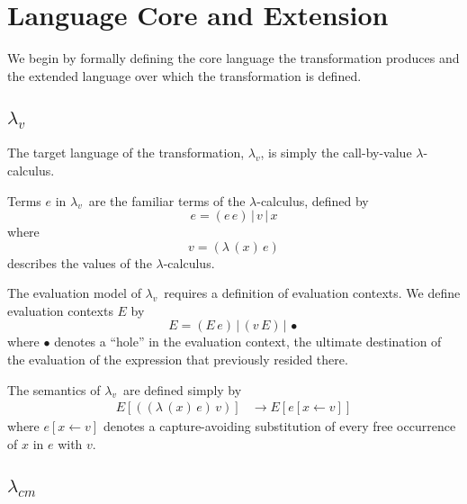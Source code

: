 \documentclass{llncs}
\newcommand{\cm}[0]{$\lambda_{cm}$}
\newcommand{\lv}[0]{$\lambda_v$}
\newcommand{\lc}[0]{$\lambda$-calculus}
\newcommand{\app}[2]{(#1\,#2)}
\newcommand{\abs}[2]{(\lambda\,(#1)\,#2)}
\newcommand{\hole}[0]{\bullet}
\newcommand{\rr}[0]{\rightarrow}
\begin{document}


\section{Language Core and Extension}

We begin by formally defining the core language the transformation produces and the extended language over which the transformation is defined.

\subsection{\lv}

The target language of the transformation, \lv, is simply the call-by-value \lc.

Terms $e$ in \lv\ are the familiar terms of the \lc, defined by
\begin{equation}
e=\app{e}{e}\,|\,v\,|\,x
\end{equation}
where 
\begin{equation}
v=\abs{x}{e}
\end{equation}
describes the values of the \lc.

The evaluation model of \lv\ requires a definition of evaluation contexts. We define evaluation contexts $E$ by
\begin{equation}
E=\app{E}{e}\,|\,\app{v}{E}\,|\,\hole
\end{equation}
where $\hole$ denotes a ``hole'' in the evaluation context, the ultimate destination of the evaluation of the expression that previously resided there.

The semantics of \lv\ are defined simply by
\begin{align}
E[\app{\abs{x}{e}}{v}]  &\rr E[e[x\leftarrow v]]
\end{align}
where $e[x\leftarrow v]$ denotes a capture-avoiding substitution of every free occurrence of $x$ in $e$ with $v$.

\subsection{\cm}
\end{document}
